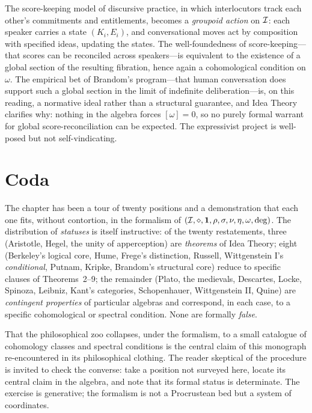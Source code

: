 The score-keeping model of discursive practice, in which interlocutors
track each other's commitments and entitlements, becomes a
\emph{groupoid action} on $\mathcal{I}$: each speaker carries a state
$(K_i, E_i)$, and conversational moves act by composition with
specified ideas, updating the states. The well-foundedness of
score-keeping---that scores can be reconciled across speakers---is
equivalent to the existence of a global section of the resulting
fibration, hence again a cohomological condition on $\omega$. The
empirical bet of Brandom's program---that human conversation does
support such a global section in the limit of indefinite
deliberation---is, on this reading, a normative ideal rather than a
structural guarantee, and Idea Theory clarifies why: nothing in the
algebra forces $[\omega] = 0$, so no purely formal warrant for global
score-reconciliation can be expected. The expressivist project is
well-posed but not self-vindicating.

\section*{Coda}

The chapter has been a tour of twenty positions and a demonstration that
each one fits, without contortion, in the formalism of
$(\mathcal{I},\mathbin{\diamond},\mathbf{1},\rho,\sigma,\nu,\eta,\omega,\deg)$. The
distribution of \emph{statuses} is itself instructive: of the twenty
restatements, three (Aristotle, Hegel, the unity of apperception) are
\emph{theorems} of Idea Theory; eight (Berkeley's logical core, Hume,
Frege's distinction, Russell, Wittgenstein I's \emph{conditional},
Putnam, Kripke, Brandom's structural core) reduce to specific clauses of
Theorems~2--9; the remainder (Plato, the medievals, Descartes, Locke,
Spinoza, Leibniz, Kant's categories, Schopenhauer, Wittgenstein II,
Quine) are \emph{contingent properties} of particular algebras and
correspond, in each case, to a specific cohomological or
spectral condition. None are formally \emph{false}.

That the philosophical zoo collapses, under the formalism, to a small
catalogue of cohomology classes and spectral conditions is the central
claim of this monograph re-encountered in its philosophical clothing.
The reader skeptical of the procedure is invited to check the converse:
take a position not surveyed here, locate its central claim in the
algebra, and note that its formal status is determinate. The exercise
is generative; the formalism is not a Procrustean bed but a system of
coordinates.

